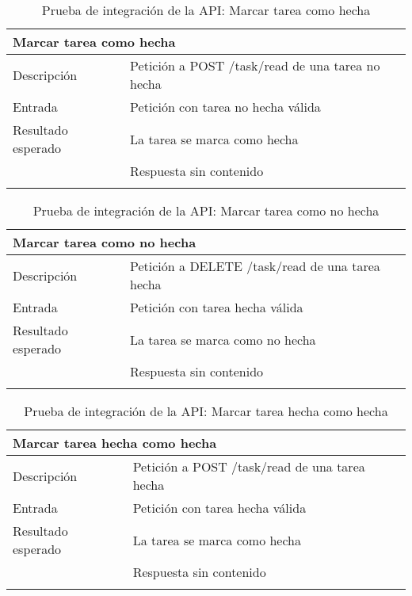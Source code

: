 \vspace{-5pt}
\begin{longtable}{|p{} p{}|}
    \hline
    \multicolumn{2}{|l|}{\textbf{Marcar tarea como hecha}} \\ \hline 
    Descripción                 & Petición a POST /task/read de una tarea no hecha\\ \hline
    Entrada                     & Petición con tarea no hecha válida \\ 
    Resultado esperado          & La tarea se marca como hecha \\ \hline
                                & Respuesta sin contenido \\ \hline
    \caption{Prueba de integración de la API: Marcar tarea como hecha}
    \label{cp:i:api:marcar_tarea_hecha}
\end{longtable}

\vspace{-10pt}
\begin{longtable}{|p{} p{}|}
    \hline
    \multicolumn{2}{|l|}{\textbf{Marcar tarea como no hecha}} \\ \hline 
    Descripción                 & Petición a DELETE /task/read de una tarea hecha\\ \hline
    Entrada                     & Petición con tarea hecha válida \\
    Resultado esperado          & La tarea se marca como no hecha \\
                                & Respuesta sin contenido \\ \hline
    \caption{Prueba de integración de la API: Marcar tarea como no hecha}
    \label{cp:i:api:marcar_tarea_no_hecha}
\end{longtable}

\vspace{-10pt}
\begin{longtable}{|p{} p{}|}
    \hline
    \multicolumn{2}{|l|}{\textbf{Marcar tarea hecha como hecha}} \\ \hline 
    Descripción                 & Petición a POST /task/read de una tarea hecha\\ \hline
    Entrada                     & Petición con tarea hecha válida \\ 
    Resultado esperado          & La tarea se marca como hecha \\ 
                                & Respuesta sin contenido \\ \hline
    \caption{Prueba de integración de la API: Marcar tarea hecha como hecha}
    \label{cp:i:api:marcar_tarea_hecha_hecha}
\end{longtable}

